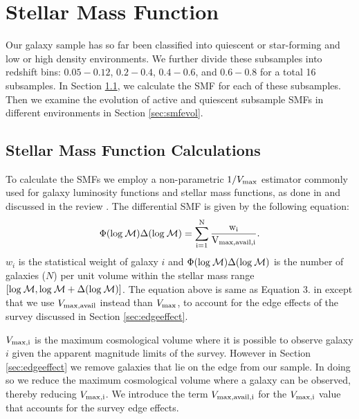 \documentclass{emulateapj}
\begin{document}
\section{Stellar Mass Function} \label{sec:smf}
Our galaxy sample has so far been classified into quiescent or star-forming and low or high density environments. We further divide these subsamples into redshift bins: $0.05-0.12$, $0.2-0.4$, $0.4-0.6$, and $0.6-0.8$ for a total 16 subsamples. In Section \ref{sec:smfcalc}, we calculate the SMF for each of these subsamples. Then we examine the evolution of active and quiescent subsample SMFs in different environments in Section \ref{sec:smfevol}.  
\subsection{Stellar Mass Function Calculations} \label{sec:smfcalc} 
To calculate the SMFs we employ a non-parametric $1/{V_{\rm{max}}}$ estimator commonly used for galaxy luminosity functions and stellar mass functions, as done in \cite{Moustakas:2013aa} and discussed in the review \cite{Johnston:2011aa}. The differential SMF is given by the following equation:
\begin{equation} \label{eq:phi}
\Phi(\rm{log}\: \mathcal{M}) \Delta(\rm{log} \:\mathcal{M}) = \sum\limits_{i=1}^{N} \frac{w_i}{V_{\rm{max,avail},i}}. 
\end{equation}
$w_i$ is the statistical weight of galaxy $i$ and $\Phi(\rm{log}\: \mathcal{M}) \Delta(\rm{log}\: \mathcal{M})$ is the number of galaxies ($N$) per unit volume within the stellar mass range $[\rm{log} \:\mathcal{M}, \rm{log} \:\mathcal{M}+\Delta(\rm{log} \:\mathcal{M})]$. The equation above is same as Equation 3. in \cite{Moustakas:2013aa} except that we use $V_{\rm{max,avail}}$ instead than $V_{\rm{max}}$, to account for the edge effects of the survey discussed in Section \ref{sec:edgeeffect}. 

$V_{\rm{max},i}$ is the maximum cosmological volume where it is possible to observe galaxy $i$ given the apparent magnitude limits of the survey. However in Section \ref{sec:edgeeffect} we remove galaxies that lie on the edge from our sample. In doing so we reduce the maximum cosmological volume where a galaxy can be observed, thereby reducing $V_{\rm{max},i}$. We introduce the term $V_{\rm{max,avail},i}$ for the $V_{\rm{max},i}$ value that accounts for the survey edge effects. 
\end{document}
